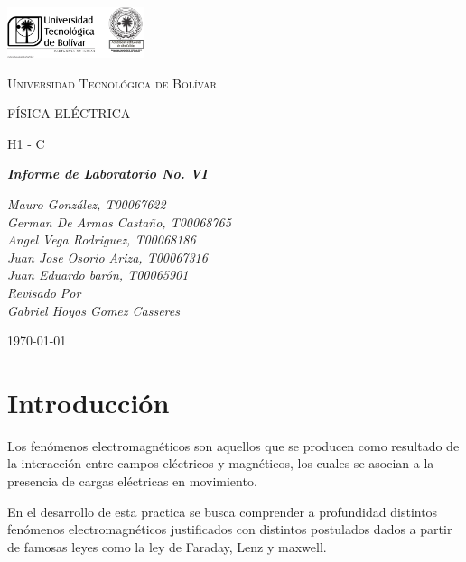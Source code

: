 \documentclass[twocolumn, 12pt]{article}
\begin{document}
\begin{titlepage}
	\centering
	\includegraphics[width=0.3\textwidth]{Images/logo_utb.png}\par\vspace{1cm}
	{\scshape\LARGE Universidad Tecnológica de Bolívar \par}
	\vspace{1cm}

	{\scshape\Large FÍSICA ELÉCTRICA \par}
	\vspace{.2cm}

	{\scshape\Large H1 - C \par}
	\vspace{1cm}
	\slshape {\Large \bfseries{}Informe de Laboratorio No. VI\\}
	\vspace{1cm}

	\slshape {\itshape{} Mauro González, T00067622 \\}
	\slshape {\itshape{} German De Armas Castaño, T00068765 \\}
	\slshape {\itshape{} Angel Vega Rodriguez, T00068186 \\}
	\slshape {\itshape{} Juan Jose Osorio Ariza, T00067316 \\}
	\slshape {\itshape{} Juan Eduardo barón, T00065901 \\}
	\vfill
	Revisado Por \\
	Gabriel Hoyos Gomez Casseres\\
	{\large \today\par}
\end{titlepage}

\section{Introducción}

Los fenómenos electromagnéticos son aquellos que se
producen como resultado de la interacción entre campos
eléctricos y magnéticos, los cuales se asocian a la
presencia de cargas eléctricas en movimiento.

En el desarrollo de esta practica se busca comprender a
profundidad distintos fenómenos electromagnéticos
justificados con distintos postulados dados a partir de
famosas leyes como la ley de Faraday, Lenz y maxwell.
\end{document}
